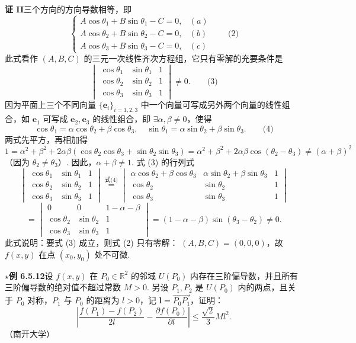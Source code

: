 \documentclass[UTF8,12pt,a4paper,fontset=fandol]{ctexart}
\begin{document}
\noindent\textbf{证 II}\quad 三个方向的方向导数相等，即
\[
\begin{cases}
  A\cos\theta_1+B\sin\theta_1-C=0, &(a)\\
  A\cos\theta_2+B\sin\theta_2-C=0, &(b)\\
  A\cos\theta_3+B\sin\theta_3-C=0, &(c)
\end{cases}\qquad\text{(2)}
\]
此式看作 $(A,B,C)$ 的三元一次线性齐次方程组，它只有零解的充要条件是
\[
  \begin{vmatrix}
    \cos\theta_1&\sin\theta_1&1\\
    \cos\theta_2&\sin\theta_2&1\\
    \cos\theta_3&\sin\theta_3&1
  \end{vmatrix}\ne0. \qquad\text{(3)}
\]
因为平面上三个不同向量 $\{\mathbf e_i\}_{i=1,2,3}$ 中一个向量可写成另外两个向量的线性组合，如 $\mathbf e_1$ 可写成 $\mathbf e_2,\mathbf e_3$ 的线性组合，即 $\exists\alpha,\beta\ne0$，使得
\[
  \cos\theta_1=\alpha\cos\theta_2+\beta\cos\theta_3,\quad
  \sin\theta_1=\alpha\sin\theta_2+\beta\sin\theta_3. \qquad\text{(4)}
\]
两式先平方，再相加得
\[
  1=\alpha^2+\beta^2+2\alpha\beta(\cos\theta_2\cos\theta_3+\sin\theta_2\sin\theta_3)
  =
  \alpha^2+\beta^2+2\alpha\beta\cos(\theta_2-\theta_3)\ne(\alpha+\beta)^2
\]
（因为 $\theta_2\ne\theta_3$）. 因此，$\alpha+\beta\ne1$. 式 (3) 的行列式
\[
\begin{vmatrix}
  \cos\theta_1&\sin\theta_1&1\\
  \cos\theta_2&\sin\theta_2&1\\
  \cos\theta_3&\sin\theta_3&1
\end{vmatrix}
\overset{\text{式(4)}}{=}
\begin{vmatrix}
  \alpha\cos\theta_2+\beta\cos\theta_3&
  \alpha\sin\theta_2+\beta\sin\theta_3&1\\
  \cos\theta_2&\sin\theta_2&1\\
  \cos\theta_3&\sin\theta_3&1
\end{vmatrix}
\]
\[
  =
\begin{vmatrix}
  0&0&1-\alpha-\beta\\
  \cos\theta_2&\sin\theta_2&1\\
  \cos\theta_3&\sin\theta_3&1
\end{vmatrix}
  =(1-\alpha-\beta)\sin(\theta_3-\theta_2)\ne0.
\]
此式说明：要式 (3) 成立，则式 (2) 只有零解：
$(A,B,C)=(0,0,0)$，故 $f(x,y)$ 在点 $(x_0,y_0)$ 处不可微.

\noindent\textbf{\ensuremath{\star}例 6.5.12}\quad 设 $f(x,y)$ 在 $P_0\in\mathbb R^2$ 的邻域 $U(P_0)$ 内存在三阶偏导数，并且所有三阶偏导数的绝对值不超过常数 $M>0$. 另设 $P_1,P_2$ 是 $U(P_0)$ 内的两点，且关于 $P_0$ 对称，$P_1$ 与 $P_0$ 的距离为 $l>0$，记 $\mathbf l=\overrightarrow{P_0P_1}$，证明：
\[
  \left|
  \frac{f(P_1)-f(P_2)}{2l}
  -
  \frac{\partial f(P_0)}{\partial l}
  \right|
  \le
  \frac{\sqrt2}{3}Ml^2.
\]
（南开大学）
\end{document}

